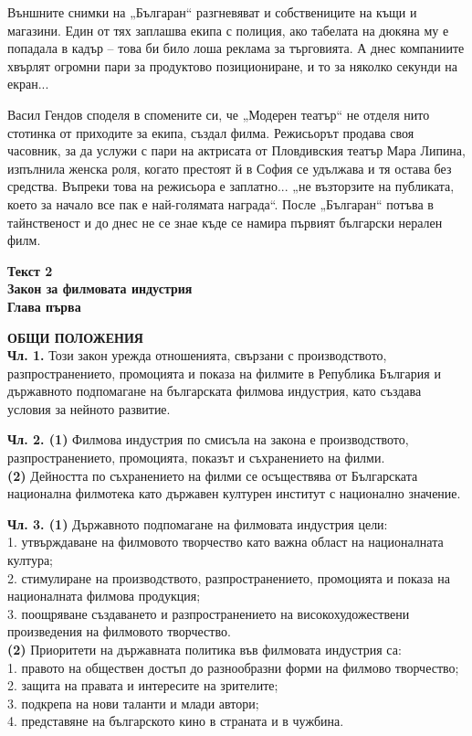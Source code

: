 \documentclass[12pt,a4paper]{article}
\begin{document}
Външните снимки на „Българан“ разгневяват и собствениците на къщи и магазини. Един от тях заплашва екипа с полиция, ако табелата на дюкяна му е попадала в кадър – това би било лоша реклама за търговията. А днес компаниите хвърлят огромни пари за продуктово позициониране, и то за няколко секунди на екран... 

Васил Гендов споделя в спомените си, че „Модерен театър“ не отделя нито стотинка от приходите за екипа, създал филма. Режисьорът продава своя часовник, за да услужи с пари на актрисата от Пловдивския театър Мара Липина, изпълнила женска роля, когато престоят й в София се удължава и тя остава без средства. Въпреки това на режисьора е заплатно... „не възторзите на публиката, което за начало все пак е най-голямата награда“. После „Българан“ потъва в тайнственост и до днес не се знае къде се намира първият български нерален филм.

\vspace{0.6cm}

\noindent
\textbf{Текст 2} \\
\textbf{Закон за филмовата индустрия} \\
\textbf{Глава първа}

\vspace{0.2cm}
\noindent
\textbf{ОБЩИ ПОЛОЖЕНИЯ} \\
\textbf{Чл. 1.} Този закон урежда отношенията, свързани с производството, разпространението, промоцията и показа на филмите в Република България и държавното подпомагане на българската филмова индустрия, като създава условия за нейното развитие.

\noindent
\textbf{Чл. 2. (1)} Филмова индустрия по смисъла на закона е производството, разпространението, промоцията, показът и съхранението на филми. \\
\textbf{(2)} Дейността по съхранението на филми се осъществява от Българската национална филмотека като държавен културен институт с национално значение.

\noindent
\textbf{Чл. 3. (1)} Държавното подпомагане на филмовата индустрия цели: \\
1. утвърждаване на филмовото творчество като важна област на националната култура; \\
2. стимулиране на производството, разпространението, промоцията и показа на националната филмова продукция; \\
3. поощряване създаването и разпространението на високохудожествени произведения на филмовото творчество. \\
\textbf{(2)} Приоритети на държавната политика във филмовата индустрия са: \\
1. правото на обществен достъп до разнообразни форми на филмово творчество; \\
2. защита на правата и интересите на зрителите; \\
3. подкрепа на нови таланти и млади автори; \\
4. представяне на българското кино в страната и в чужбина.
\end{document}
